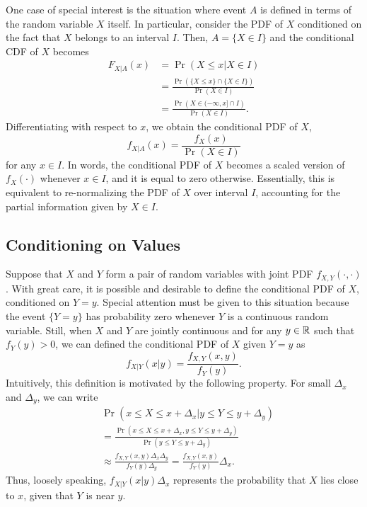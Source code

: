 One case of special interest is the situation where event $A$ is defined in terms of the random variable $X$ itself.
In particular, consider the PDF of $X$ conditioned on the fact that $X$ belongs to an interval $I$.
Then, $A = \{ X \in I \}$ and the conditional CDF of $X$ becomes
\begin{equation*}
\begin{split}
F_{X|A} (x) &= \Pr (X \leq x | X \in I) \\
&= \frac{ \Pr \left( \{ X \leq x \} \cap \{ X \in I \} \right) }{\Pr(X \in I)} \\
&= \frac{ \Pr \left( X \in (-\infty, x] \cap I \right) }{\Pr(X \in I)} .
\end{split}
\end{equation*}
Differentiating with respect to $x$, we obtain the conditional PDF of $X$,
\begin{equation*}
f_{X|A} (x) = \frac{ f_X (x) }{ \Pr (X \in I) } 
\end{equation*}
for any $x \in I$.
In words, the conditional PDF of $X$ becomes a scaled version of $f_X(\cdot)$ whenever $x \in I$, and it is equal to zero otherwise.
Essentially, this is equivalent to re-normalizing the PDF of $X$ over interval $I$, accounting for the partial information given by $X \in I$.


\subsection{Conditioning on Values}

Suppose that $X$ and $Y$ form a pair of random variables with joint PDF $f_{X,Y} (\cdot, \cdot)$.
With great care, it is possible and desirable to define the conditional PDF of $X$, conditioned on $Y = y$. 
Special attention must be given to this situation because the event $\{ Y = y \}$ has probability zero whenever $Y$ is a continuous random variable.
Still, when $X$ and $Y$ are jointly continuous and for any $y \in \mathbb{R}$ such that $f_Y (y) > 0$, we can defined the conditional PDF of $X$ given $Y = y$ as
\begin{equation} \label{equation:ConditionalPDF}
f_{X|Y} (x|y) = \frac{ f_{X,Y} (x,y) }{ f_Y (y) } .
\end{equation}
Intuitively, this definition is motivated by the following property.
For small $\Delta_x$ and $\Delta_y$, we can write
\begin{equation*}
\begin{split}
&\Pr (x \leq X \leq x + \Delta_x | y \leq Y \leq y + \Delta_y) \\
&= \frac{\Pr (x \leq X \leq x + \Delta_x, y \leq Y \leq y + \Delta_y)}
{\Pr (y \leq Y \leq y + \Delta_y)} \\
&\approx \frac{f_{X,Y} (x, y) \Delta_x \Delta_y} {f_Y (y) \Delta_y}
= \frac{f_{X,Y} (x, y)}{f_Y (y)} \Delta_x .
\end{split}
\end{equation*}
Thus, loosely speaking, $f_{X|Y} (x|y) \Delta_x$ represents the probability that $X$ lies close to $x$, given that $Y$ is near $y$.

